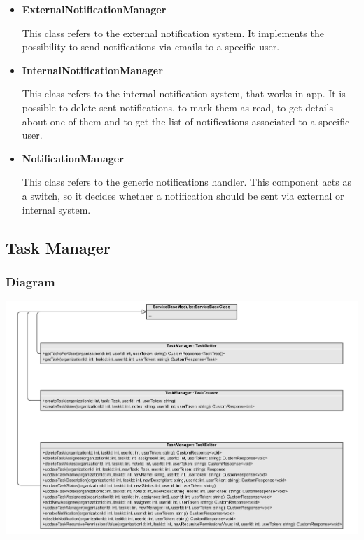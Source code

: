 \documentclass{article}
\begin{document}
\begin{itemize}

\item \textbf{ExternalNotificationManager}

This class refers to the external notification system. It implements the possibility to send notifications via emails to a specific user. 

\item \textbf{InternalNotificationManager}

This class refers to the internal notification system, that works in-app. It is possible to delete sent notifications, to mark them as read, to get details about one of them and to get the list of notifications associated to a specific user.

\item \textbf{NotificationManager}

This class refers to the generic notifications handler. This component acts as a switch, so it decides whether a notification should be sent via external or internal system.
\end{itemize}

\subsection{Task Manager} %
\subsubsection{Diagram}
\includegraphics[width=\textwidth, height=\textheight, keepaspectratio]{images/class_diagram/task_manager.jpg}
\end{document}
